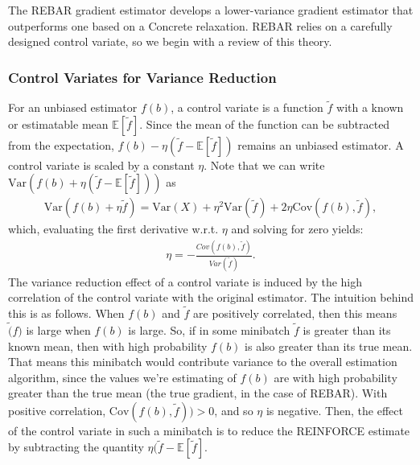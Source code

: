 \documentclass{article}
\newcommand{\var}{\text{Var}}
\begin{document}

The REBAR gradient estimator develops a lower-variance gradient estimator that outperforms one based on a Concrete relaxation.
REBAR relies on a carefully designed control variate, so we begin with a review of this theory.

\subsubsection{Control Variates for Variance Reduction}
For an unbiased estimator $f(b)$, a control variate is a function $\tilde{f}$ with a known or estimatable mean $\mathbb{E}[\tilde{f}]$. Since the mean of the function can be subtracted from the expectation, $f(b) - \eta (\tilde{f}-\mathbb{E}[\tilde{f}])$ remains an unbiased estimator.
A control variate is scaled by a constant $\eta$.
Note that we can write $\text{Var}(f(b)+\eta(\tilde{f}-\mathbb{E}[\tilde{f}]))$ as
\begin{align}
    \text{Var}(f(b)+\eta \tilde{f}) = \text{Var}(X) + \eta^2\var(\tilde{f}) + 2 \eta \text{Cov}(f(b),\tilde{f}),
\end{align}
which, evaluating the first derivative w.r.t. $\eta$ and solving for zero yields:
\begin{align}
    \eta = -\frac{Cov(f(b), \tilde{f})}{Var(\tilde{f})}.
\end{align}
The variance reduction effect of a control variate is induced by the high correlation of the control variate with the original estimator.
The intuition behind this is as follows.
When $f(b)$ and $\tilde{f}$ are positively correlated, then this means $\tilde(f)$ is large when $f(b)$ is large.
So, if in some minibatch $\tilde{f}$ is greater than its known mean, then with high probability $f(b)$ is also greater than its true mean.
That means this minibatch would contribute variance to the overall estimation algorithm, since the values we're estimating of $f(b)$ are with high probability greater than the true mean (the true gradient, in the case of REBAR). 
With positive correlation, $\text{Cov}(f(b), \tilde{f})) > 0$, and so $\eta$ is negative. 
Then, the effect of the control variate in such a minibatch is to reduce the REINFORCE estimate by subtracting the quantity $\eta(\tilde{f} - \mathbb{E}[\tilde{f}]$.

\end{document}
